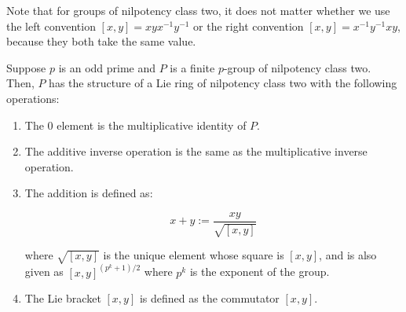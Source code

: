 \documentclass[10pt]{amsart}
\begin{document}
Note that for groups of nilpotency class two, it does not matter
whether we use the left convention $[x,y] = xyx^{-1}y^{-1}$ or the
right convention $[x,y] = x^{-1}y^{-1}xy$, because they both take the
same value.

\begin{theorem}
  Suppose $p$ is an odd prime and $P$ is a finite $p$-group of
  nilpotency class two. Then, $P$ has the structure of a Lie ring of
  nilpotency class two with the following operations:

  \begin{enumerate}
  \item The $0$ element is the multiplicative identity of $P$.
  \item The additive inverse operation is the same as the
    multiplicative inverse operation.
  \item The addition is defined as:

    $$x + y := \frac{xy}{\sqrt{[x,y]}}$$

    where $\sqrt{[x,y]}$ is the unique element whose square is
    $[x,y]$, and is also given as $[x,y]^{(p^k + 1)/2}$ where $p^k$ is
    the exponent of the group.
  \item The Lie bracket $[x,y]$ is defined as the commutator $[x,y]$.
  \end{enumerate}
\end{theorem}
\end{document}

